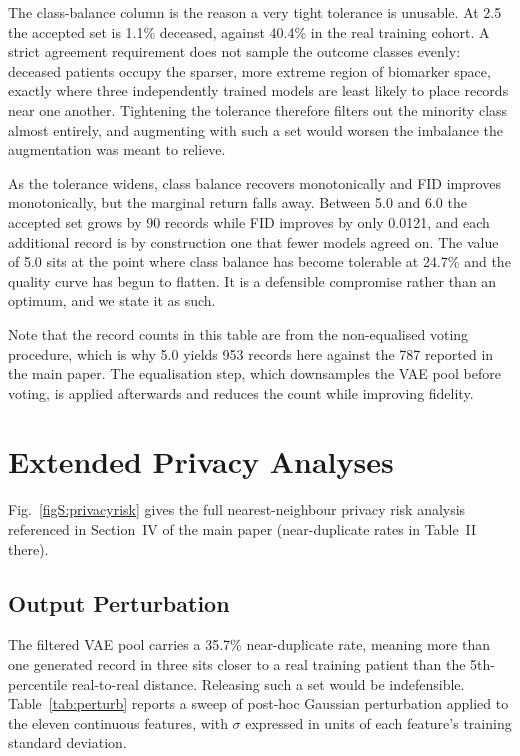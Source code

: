 \documentclass[journal,onecolumn]{IEEEtran}
\begin{document}
The class-balance column is the reason a very tight tolerance is unusable. At 2.5 the accepted set is 1.1\% deceased, against 40.4\% in the real training cohort. A strict agreement requirement does not sample the outcome classes evenly: deceased patients occupy the sparser, more extreme region of biomarker space, exactly where three independently trained models are least likely to place records near one another. Tightening the tolerance therefore filters out the minority class almost entirely, and augmenting with such a set would worsen the imbalance the augmentation was meant to relieve.

As the tolerance widens, class balance recovers monotonically and FID improves monotonically, but the marginal return falls away. Between 5.0 and 6.0 the accepted set grows by 90 records while FID improves by only 0.0121, and each additional record is by construction one that fewer models agreed on. The value of 5.0 sits at the point where class balance has become tolerable at 24.7\% and the quality curve has begun to flatten. It is a defensible compromise rather than an optimum, and we state it as such.

Note that the record counts in this table are from the non-equalised voting procedure, which is why 5.0 yields 953 records here against the 787 reported in the main paper. The equalisation step, which downsamples the VAE pool before voting, is applied afterwards and reduces the count while improving fidelity.

\section{Extended Privacy Analyses}

Fig.~\ref{figS:privacyrisk} gives the full nearest-neighbour privacy risk analysis referenced in Section~IV of the main paper (near-duplicate rates in Table~II there).

\subsection{Output Perturbation}

The filtered VAE pool carries a 35.7\% near-duplicate rate, meaning more than one generated record in three sits closer to a real training patient than the 5th-percentile real-to-real distance. Releasing such a set would be indefensible. Table~\ref{tab:perturb} reports a sweep of post-hoc Gaussian perturbation applied to the eleven continuous features, with $\sigma$ expressed in units of each feature's training standard deviation.
\end{document}
